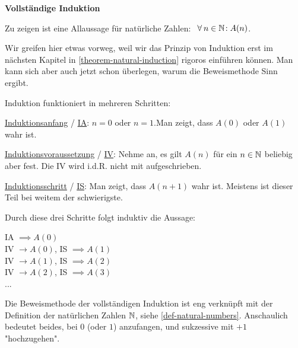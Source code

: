 \begin{shadedbox}
    \textbf{Vollständige Induktion}

    Zu zeigen ist eine Allaussage für natürliche Zahlen: $\forall n \in \N\!: A(n)$.

    Wir greifen hier etwas vorweg, weil wir das Prinzip von Induktion erst im nächsten Kapitel in \ref{theorem-natural-induction} rigoros einführen können. Man kann sich aber auch jetzt schon überlegen, warum die Beweismethode Sinn ergibt.

    Induktion funktioniert in mehreren Schritten:

    \uline{Induktionsanfang} / \uline{IA}: $n = 0$ oder $n = 1$.\footnotemark Man zeigt, dass $A(0)$ oder $A(1)$ wahr ist.

    \uline{Induktionsvoraussetzung} / \uline{IV}: Nehme an, es gilt $A(n)$ für ein $n \in \mathbb{N}$ beliebig aber fest. Die IV wird i.d.R. nicht mit aufgeschrieben.

    \uline{Induktionsschritt} / \uline{IS}: Man zeigt, dass $A(n+1)$ wahr ist. Meistens ist dieser Teil bei weitem der schwierigste.

    Durch diese drei Schritte folgt induktiv die Aussage:

    IA $\implies A(0)$\\
    IV $\rightarrow A(0)$, IS $\implies A(1)$\\
    IV $\rightarrow A(1)$, IS $\implies A(2)$\\
    IV $\rightarrow A(2)$, IS $\implies A(3)$\\
    ...
\end{shadedbox}

Die Beweismethode der vollständigen Induktion ist eng verknüpft mit der Definition der natürlichen Zahlen $\mathbb{N}$, siehe \ref{def-natural-numbers}. Anschaulich bedeutet beides, bei $0$ (oder $1$) anzufangen, und sukzessive mit $+1$ "hochzugehen".

